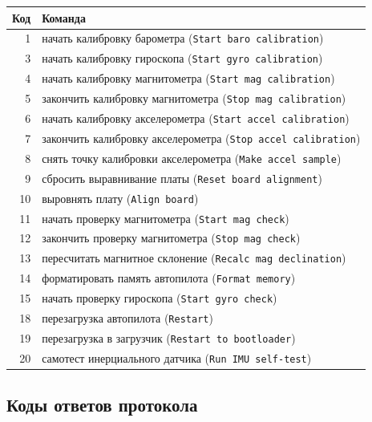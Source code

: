 \begin{center}
\small
\begin{tabularx}{\linewidth}{@{}r X@{}}
\toprule
\textbf{Код} & \textbf{Команда} \\
\midrule
1 & начать калибровку барометра (\texttt{Start baro calibration}) \\
3 & начать калибровку гироскопа (\texttt{Start gyro calibration}) \\
4 & начать калибровку магнитометра (\texttt{Start mag calibration}) \\
5 & закончить калибровку магнитометра (\texttt{Stop mag calibration}) \\
6 & начать калибровку акселерометра (\texttt{Start accel calibration}) \\
7 & закончить калибровку акселерометра (\texttt{Stop accel calibration}) \\
8 & снять точку калибровки акселерометра (\texttt{Make accel sample}) \\
9 & сбросить выравнивание платы (\texttt{Reset board alignment}) \\
10 & выровнять плату (\texttt{Align board}) \\
11 & начать проверку магнитометра (\texttt{Start mag check}) \\
12 & закончить проверку магнитометра (\texttt{Stop mag check}) \\
13 & пересчитать магнитное склонение (\texttt{Recalc mag declination}) \\
14 & форматировать память автопилота (\texttt{Format memory}) \\
15 & начать проверку гироскопа (\texttt{Start gyro check}) \\
18 & перезагрузка автопилота (\texttt{Restart}) \\
19 & перезагрузка в загрузчик (\texttt{Restart to bootloader}) \\
20 & самотест инерциального датчика (\texttt{Run IMU self-test}) \\
\bottomrule
\end{tabularx}
\end{center}

\subsection*{Коды ответов протокола}

